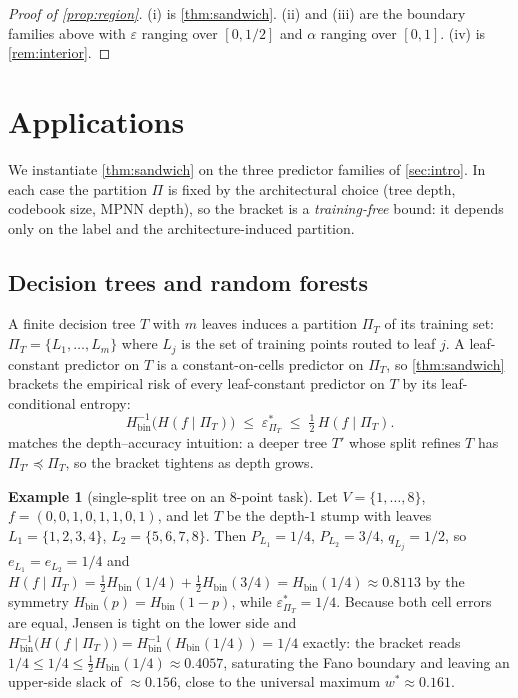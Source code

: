 \documentclass[10pt]{article}
\theoremstyle{definition}
\newtheorem{example}[theorem]{Example}
\theoremstyle{remark}
\newcommand{\Hbin}{H_{\mathrm{bin}}}
\newcommand{\Hinv}{H_{\mathrm{bin}}^{-1}}
\newcommand{\eps}{\varepsilon}
\begin{document}
\begin{proof}[Proof of \cref{prop:region}]
(i) is \cref{thm:sandwich}. (ii) and (iii) are the boundary
families above with $\eps$ ranging over $[0, 1/2]$ and $\alpha$
ranging over $[0, 1]$. (iv) is \cref{rem:interior}.
\end{proof}

\section{Applications}\label{sec:apps}

We instantiate \cref{thm:sandwich} on the three predictor
families of \cref{sec:intro}. In each case the partition $\Pi$ is
fixed by the architectural choice (tree depth, codebook size,
MPNN depth), so the bracket is a \emph{training-free} bound: it
depends only on the label and the architecture-induced partition.

\subsection{Decision trees and random forests}\label{sec:apps:trees}

A finite decision tree $T$ with $m$ leaves induces a partition
$\Pi_{T}$ of its training set: $\Pi_{T} = \{L_{1}, \ldots, L_{m}\}$
where $L_{j}$ is the set of training points routed to leaf $j$. A
leaf-constant predictor on $T$ is a constant-on-cells predictor
on $\Pi_{T}$, so \cref{thm:sandwich} brackets the empirical risk
of every leaf-constant predictor on $T$ by its leaf-conditional
entropy:
\[
  \Hinv\!\bigl(H(f \mid \Pi_{T})\bigr) \;\le\; \eps^{\!*}_{\Pi_{T}}
  \;\le\; \tfrac{1}{2}\, H(f \mid \Pi_{T}).
\]
 matches the depth--accuracy intuition: a
deeper tree $T'$ whose split refines $T$ has $\Pi_{T'} \preceq \Pi_{T}$,
so the bracket tightens as depth grows.

\begin{example}[single-split tree on an $8$-point task]\label{ex:tree}
Let $V = \{1, \ldots, 8\}$, $f = (0, 0, 1, 0, 1, 1, 0, 1)$, and
let $T$ be the depth-$1$ stump with leaves
$L_{1} = \{1, 2, 3, 4\}$, $L_{2} = \{5, 6, 7, 8\}$. Then $P_{L_{1}} = 1/4$, $P_{L_{2}} = 3/4$,
$q_{L_{j}} = 1/2$, so $e_{L_{1}} = e_{L_{2}} = 1/4$ and
\(
  H(f \mid \Pi_{T}) = \tfrac{1}{2}\Hbin(1/4) + \tfrac{1}{2}\Hbin(3/4)
  = \Hbin(1/4) \approx 0.8113
\)
by the symmetry $\Hbin(p) = \Hbin(1-p)$, while
$\eps^{\!*}_{\Pi_{T}} = 1/4$. Because both cell errors are equal,
Jensen is tight on the lower side and
$\Hinv\bigl(H(f\mid\Pi_{T})\bigr) = \Hinv(\Hbin(1/4)) = 1/4$
exactly: the bracket reads
$1/4 \le 1/4 \le \tfrac{1}{2}\Hbin(1/4) \approx 0.4057$,
saturating the Fano boundary and leaving an upper-side slack of
$\approx 0.156$, close to the universal maximum $w^{*}\approx 0.161$.
\end{example}
\end{document}
